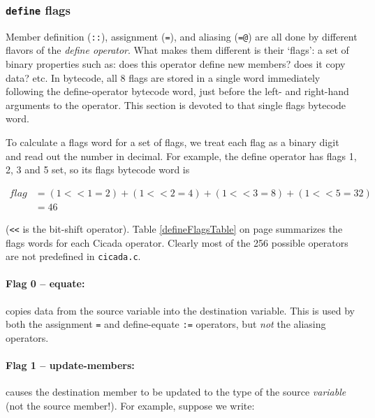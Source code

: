 \documentclass{article}
\begin{document}


\subsubsection{\texttt{define} flags} 

Member definition (\verb#::#), assignment (\verb#=#), and aliasing (\verb#=@#) are all done by different flavors of the \emph{define operator}.  What makes them different is their `flags':  a set of binary properties such as:  does this operator define new members? does it copy data? etc.  In bytecode, all 8 flags are stored in a single word immediately following the define-operator bytecode word, just before the left- and right-hand arguments to the operator.  This section is devoted to that single flags bytecode word.

To calculate a flags word for a set of flags, we treat each flag as a binary digit and read out the number in decimal.  For example, the define operator has flags 1, 2, 3 and 5 set, so its flags bytecode word is

\begin{align*}
flag &= (1 << 1 = 2) + (1 << 2 = 4) + (1 << 3 = 8) + (1 << 5 = 32)\\
&= 46
\end{align*}

\noindent (\verb#<<# is the bit-shift operator).  Table \ref{defineFlagsTable} on page \pageref{defineFlagsTable} summarizes the flags words for each Cicada operator.  Clearly most of the 256 possible operators are not predefined in \verb#cicada.c#.\\


\paragraph{Flag 0 -- equate:}  copies data from the source variable into the destination variable.  This is used by both the assignment \verb#=# and define-equate \verb#:=# operators, but \emph{not} the aliasing operators.\\


\paragraph{Flag 1 -- update-members:}  causes the destination member to be updated to the type of the source \emph{variable} (not the source member!).  For example, suppose we write:
\end{document}
